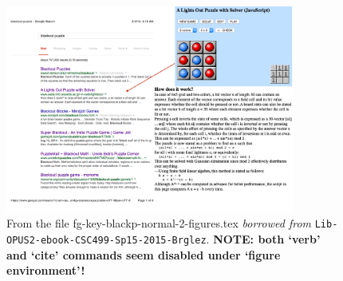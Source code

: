\begin{figure}[h!]

\centering
\vspace*{-0ex}%
\includegraphics[width=0.85\textwidth]{fg-key-blackp-descr-a}

\caption[From the file fg-key-blackp-normal-1-figures.tex]
{From the file fg-key-blackp-normal-2-figures.tex {\em borrowed from} {\tt Lib-OPUS2-ebook-CSC499-Sp15-2015-Brglez}.
{\bf NOTE: both `verb' and `cite' commands seem disabled under `figure environment'!}
}
\label{fg-key-blackp-normal-1-figure}
\end{figure}


